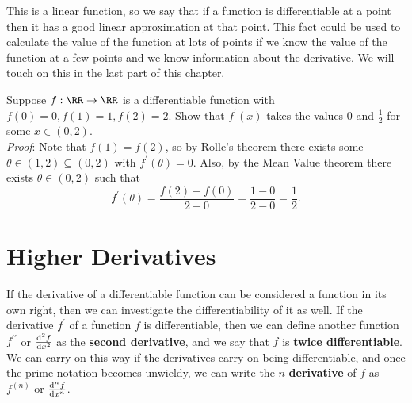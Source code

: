 \documentclass[../real_analysis.tex]{subfiles}
\begin{document}
            This is a linear function, so we say that if a function is differentiable at a point then it has a good linear approximation at that point. This fact could be used to calculate the value of the function at lots of points if we know the value of the function at a few points and we know information about the derivative. We will touch on this in the last part of this chapter.
            \begin{example}
                Suppose $f:\RR\to\RR$ is a differentiable function with $f(0)=0,f(1)=1,f(2)=2$. Show that $f^\prime(x)$ takes the values 0 and $\frac{1}{2}$ for some $x\in(0,2)$.\\
                \textit{Proof}: Note that $f(1)=f(2)$, so by Rolle's theorem there exists some $\theta\in(1,2)\subseteq(0,2)$ with $f^\prime(\theta)=0$. Also, by the Mean Value theorem there exists $\theta\in(0,2)$ such that
                \begin{equation}
                    f^\prime(\theta)=\frac{f(2)-f(0)}{2-0}=\frac{1-0}{2-0}=\frac{1}{2}.
                \end{equation}
            \end{example}

    \section{Higher Derivatives}\label{sec:higher-derivatives}
        If the derivative of a differentiable function can be considered a function in its own right, then we can investigate the differentiability of it as well.
        If the derivative $f^\prime$ of a function $f$ is differentiable, then we can define another function $f^{\prime\prime}$ or $\dv[2]{f}{x}$ as the \textbf{second derivative}, and we say that $f$ is \textbf{twice differentiable}.
        We can carry on this way if the derivatives carry on being differentiable, and once the prime notation becomes unwieldy, we can write the $n$ \textbf{derivative} of $f$ as $f^{(n)}$ or $\dv[n]{f}{x}$.
        
\end{document}

